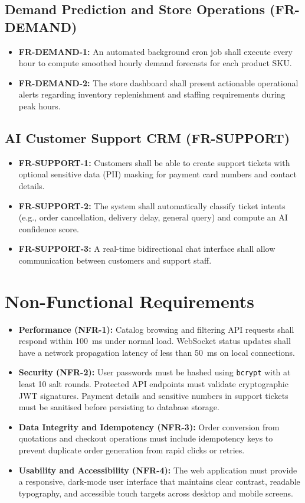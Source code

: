 \subsection{Demand Prediction and Store Operations (FR-DEMAND)}
\begin{itemize}
    \item \textbf{FR-DEMAND-1:} An automated background cron job shall execute every hour to compute smoothed hourly demand forecasts for each product SKU.
    \item \textbf{FR-DEMAND-2:} The store dashboard shall present actionable operational alerts regarding inventory replenishment and staffing requirements during peak hours.
\end{itemize}

\subsection{AI Customer Support CRM (FR-SUPPORT)}
\begin{itemize}
    \item \textbf{FR-SUPPORT-1:} Customers shall be able to create support tickets with optional sensitive data (PII) masking for payment card numbers and contact details.
    \item \textbf{FR-SUPPORT-2:} The system shall automatically classify ticket intents (e.g., order cancellation, delivery delay, general query) and compute an AI confidence score.
    \item \textbf{FR-SUPPORT-3:} A real-time bidirectional chat interface shall allow communication between customers and support staff.
\end{itemize}

\section{Non-Functional Requirements}

\begin{itemize}
    \item \textbf{Performance (NFR-1):} Catalog browsing and filtering API requests shall respond within 100~ms under normal load. WebSocket status updates shall have a network propagation latency of less than 50~ms on local connections.
    \item \textbf{Security (NFR-2):} User passwords must be hashed using \texttt{bcrypt} with at least 10 salt rounds. Protected API endpoints must validate cryptographic JWT signatures. Payment details and sensitive numbers in support tickets must be sanitised before persisting to database storage.
    \item \textbf{Data Integrity and Idempotency (NFR-3):} Order conversion from quotations and checkout operations must include idempotency keys to prevent duplicate order generation from rapid clicks or retries.
    \item \textbf{Usability and Accessibility (NFR-4):} The web application must provide a responsive, dark-mode user interface that maintains clear contrast, readable typography, and accessible touch targets across desktop and mobile screens.
\end{itemize}

